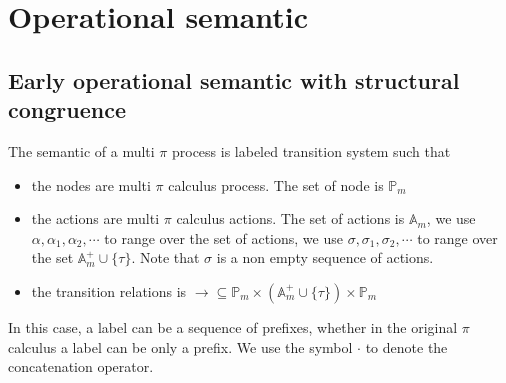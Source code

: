 \section{Operational semantic}
\subsection{Early operational semantic with structural congruence}

The semantic of a multi $\pi$ process is labeled transition system such that
\begin{itemize}
  \item 
    the nodes are multi $\pi$ calculus process. The set of node is $\mathbb{P}_{m}$
  \item
    the actions are multi $\pi$ calculus actions. The set of actions is $\mathbb{A}_{m}$, we use $\alpha, \alpha_{1}, \alpha_{2},\cdots $ to range over the set of actions, we use $\sigma, \sigma_{1}, \sigma_{2}, \cdots $ to range over the set $\mathbb{A}_{m}^{+} \cup \{\tau\}$. Note that $\sigma$ is a non empty sequence of actions.
  \item
    the transition relations is $\rightarrow\subseteq \mathbb{P}_{m}\times (\mathbb{A}_{m}^{+} \cup \{\tau\})\times \mathbb{P}_{m}$
\end{itemize}

In this case, a label can be a sequence of prefixes, whether in the original $\pi$ calculus a label can be only a prefix. We use the symbol $\cdot$ to denote the concatenation operator.

